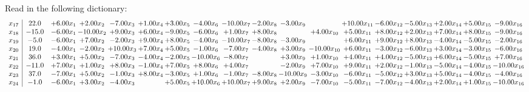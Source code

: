\documentclass[9pt]{article}
\begin{document}
Read in the following dictionary:
\[\begin{array}{c| c c@{\hskip 2pt} c@{\hskip 2pt} c@{\hskip 2pt} c@{\hskip 2pt} c@{\hskip 2pt} c@{\hskip 2pt} c@{\hskip 2pt} c@{\hskip 2pt} c@{\hskip 2pt} c@{\hskip 2pt} c@{\hskip 2pt} c@{\hskip 2pt} c@{\hskip 2pt} c@{\hskip 2pt} c@{\hskip 2pt} c@{\hskip 2pt} }
 x_{17}   &  22.0 & +  6.00 x_{1} & +  2.00 x_{2} & -7.00 x_{3} & +  1.00 x_{4} & +  3.00 x_{5} & -4.00 x_{6} & -10.00 x_{7} & -2.00 x_{8} & -3.00 x_{9} &   & + 10.00 x_{11} & -6.00 x_{12} & -5.00 x_{13} & +  2.00 x_{14} & +  5.00 x_{15} & -9.00 x_{16}\\
 x_{18}   &  -15.0 & -6.00 x_{1} & -10.00 x_{2} & +  9.00 x_{3} & +  6.00 x_{4} & -9.00 x_{5} & -6.00 x_{6} & +  1.00 x_{7} & +  8.00 x_{8} &   & +  4.00 x_{10} & +  5.00 x_{11} & +  8.00 x_{12} & +  2.00 x_{13} & +  7.00 x_{14} & +  8.00 x_{15} & -9.00 x_{16}\\
 x_{19}   &  -5.0 & -6.00 x_{1} & +  7.00 x_{2} & -2.00 x_{3} & +  9.00 x_{4} & +  8.00 x_{5} & -4.00 x_{6} & -10.00 x_{7} & -8.00 x_{8} & -3.00 x_{9} &   & +  6.00 x_{11} & +  9.00 x_{12} & +  8.00 x_{13} & -4.00 x_{14} & -5.00 x_{15} & -2.00 x_{16}\\
 x_{20}   &  19.0 & -4.00 x_{1} & -2.00 x_{2} & + 10.00 x_{3} & +  7.00 x_{4} & +  5.00 x_{5} & -1.00 x_{6} & -7.00 x_{7} & -4.00 x_{8} & +  3.00 x_{9} & -10.00 x_{10} & +  6.00 x_{11} & -3.00 x_{12} & -6.00 x_{13} & +  3.00 x_{14} & -3.00 x_{15} & -6.00 x_{16}\\
 x_{21}   &  36.0 & +  3.00 x_{1} & +  5.00 x_{2} & -7.00 x_{3} & -4.00 x_{4} & -2.00 x_{5} & -10.00 x_{6} & -8.00 x_{7} &   & +  3.00 x_{9} & +  1.00 x_{10} & +  4.00 x_{11} & +  4.00 x_{12} & -5.00 x_{13} & +  6.00 x_{14} & -5.00 x_{15} & +  7.00 x_{16}\\
 x_{22}   &  -11.0 & +  7.00 x_{1} & +  1.00 x_{2} & +  8.00 x_{3} & -1.00 x_{4} & +  7.00 x_{5} & +  8.00 x_{6} & +  4.00 x_{7} &   & -2.00 x_{9} & +  7.00 x_{10} & +  9.00 x_{11} & +  2.00 x_{12} & -1.00 x_{13} & -5.00 x_{14} & -4.00 x_{15} & -10.00 x_{16}\\
 x_{23}   &  37.0 & -7.00 x_{1} & +  5.00 x_{2} & -1.00 x_{3} & +  8.00 x_{4} & -3.00 x_{5} & +  1.00 x_{6} & -1.00 x_{7} & -8.00 x_{8} & -10.00 x_{9} & -3.00 x_{10} & -6.00 x_{11} & -5.00 x_{12} & +  3.00 x_{13} & +  5.00 x_{14} & -4.00 x_{15} & -4.00 x_{16}\\
 x_{24}   &  -1.0 & -6.00 x_{1} & +  3.00 x_{2} & -4.00 x_{3} &   & +  5.00 x_{5} & + 10.00 x_{6} & + 10.00 x_{7} & +  9.00 x_{8} & +  2.00 x_{9} & -7.00 x_{10} & -5.00 x_{11} & -7.00 x_{12} & -4.00 x_{13} & +  2.00 x_{14} & +  1.00 x_{15} & -10.00 x_{16}\\

\end{array}\]
\end{document}
